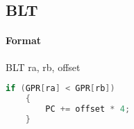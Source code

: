 \subsection{BLT}


\paragraph{Format} BLT ra, rb, offset

\begin{lstlisting}[language=c]
    if (GPR[ra] < GPR[rb])
    {
        PC += offset * 4;
    }
\end{lstlisting}
